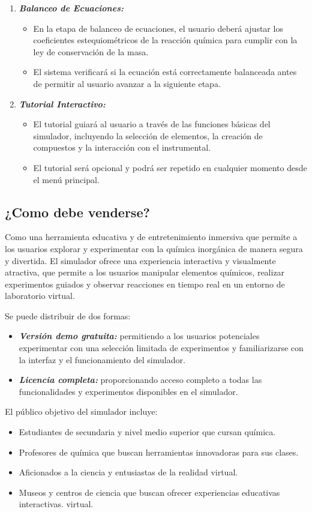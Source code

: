 \begin{enumerate}[{RN-}01. ]
    \item \textit{\textbf{Balanceo de Ecuaciones:}} 
    \begin{itemize}
        \item En la etapa de balanceo de ecuaciones, el usuario deberá ajustar los coeficientes estequiométricos de la reacción química para cumplir con la ley de conservación de la masa.   
        \item El sistema verificará si la ecuación está correctamente balanceada antes de permitir al usuario avanzar a la siguiente etapa. 
    \end{itemize}
    \item \textit{\textbf{Tutorial Interactivo: }}
    \begin{itemize}
        \item El tutorial guiará al usuario a través de las funciones básicas del simulador, incluyendo la selección de elementos, la creación de compuestos y la interacción con el instrumental. 
        \item El tutorial será opcional y podrá ser repetido en cualquier momento desde el menú principal. 
    \end{itemize}
\end{enumerate}

\subsection{¿Como debe venderse?}
Como una herramienta educativa y de entretenimiento inmersiva que permite a los usuarios explorar y experimentar con la química inorgánica de manera segura y divertida. El simulador ofrece una experiencia interactiva y visualmente atractiva, que permite a los usuarios manipular elementos químicos, realizar experimentos guiados y observar reacciones en tiempo real en un entorno de laboratorio virtual. 

Se puede distribuir de dos formas: 
\begin{itemize}
    \item\textit{\textbf{Versión demo gratuita:}} permitiendo a los usuarios potenciales experimentar con una selección limitada de experimentos y familiarizarse con la interfaz y el funcionamiento del simulador. 
    \item\textit{\textbf{Licencia completa:}} proporcionando acceso completo a todas las funcionalidades y experimentos disponibles en el simulador. 
\end{itemize}

El público objetivo del simulador incluye: 
\begin{itemize}
    \item Estudiantes de secundaria y nivel medio superior que cursan química. 
    \item Profesores de química que buscan herramientas innovadoras para sus clases. 
    \item Aficionados a la ciencia y entusiastas de la realidad virtual. 
    \item Museos y centros de ciencia que buscan ofrecer experiencias educativas interactivas. virtual.
\end{itemize}
